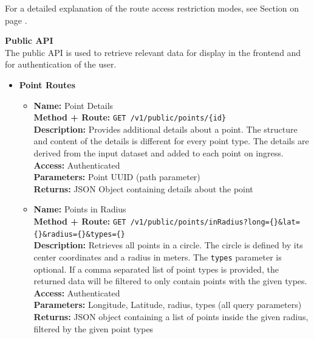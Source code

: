 For a detailed explanation of the route access restriction modes, see Section
\textbf{} on page
\pageref{middleware_route_authorisation}.

\newpage{}

\textbf{Public API}\\
The public API is used to retrieve relevant data for display in the frontend and
for authentication of the user.

\begin{itemize}
  \item{
    \textbf{Point Routes}
    \begin{itemize}
      \item { \textbf{Name:} Point Details\\
          \textbf{Method + Route:} \texttt{GET /v1/public/points/\{id\}}\\
          \textbf{Description:} Provides additional details about a point. The
          structure and content of the details is different for every point
          type. The details are derived from the input dataset and added to each
          point on ingress.\\
          \textbf{Access:} Authenticated\\
          \textbf{Parameters:} Point UUID (path parameter)\\
          \textbf{Returns:} JSON Object containing details about the point\\
        }
      \item { \textbf{Name:} Points in Radius\\
          \textbf{Method + Route:} \texttt{GET
          /v1/public/points/inRadius?long=\{\}\&lat=\{\}\&radius=\{\}\&types=\{\}}\\
          \textbf{Description:} Retrieves all points in a circle. The circle is
          defined by its center coordinates and a radius in meters. The
          \texttt{types} parameter is optional. If a comma separated list of
          point types is provided, the returned data will be filtered to only
          contain points with the given types.\\
          \textbf{Access:} Authenticated\\
          \textbf{Parameters:} Longitude, Latitude, radius, types (all query
          parameters)\\
          \textbf{Returns:} JSON object containing a list of points inside the
          given radius, filtered by the given point types\\
}
\end{itemize}}
\end{itemize}
